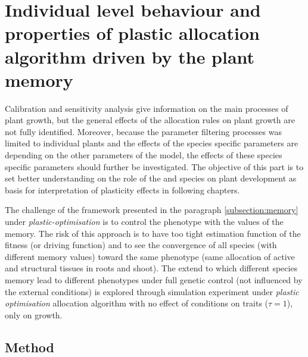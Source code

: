 


\section{Individual level behaviour and properties of plastic allocation algorithm driven by the plant memory}


Calibration and sensitivity analysis give information on the main processes of plant growth, but the general effects of the allocation rules on plant growth are not fully identified. Moreover, because the parameter filtering processes was limited to individual plants and the effects of the species specific parameters are depending on the other parameters of the model, the effects of these species specific parameters should further be investigated. The objective of this part is to set better understanding on the role of the  and species  on plant development as basis for interpretation of plasticity effects in following chapters.

The challenge of the framework presented in the paragraph \ref{subsection:memory} under \textit{plastic-optimisation} is to control the phenotype with the values of the memory. The risk of this approach is to have too tight estimation function of the fitness (or driving function) and to see the convergence of all species (with different memory values) toward the same phenotype (same allocation of active and structural tissues in roots and shoot). The extend to which different species memory lead to different phenotypes under full genetic control (not influenced by the external conditions) is explored through simulation experiment under \textit{plastic optimisation} allocation algorithm with no effect of conditions on traits ($\tau = 1$), only on growth.

\subsection{Method}




